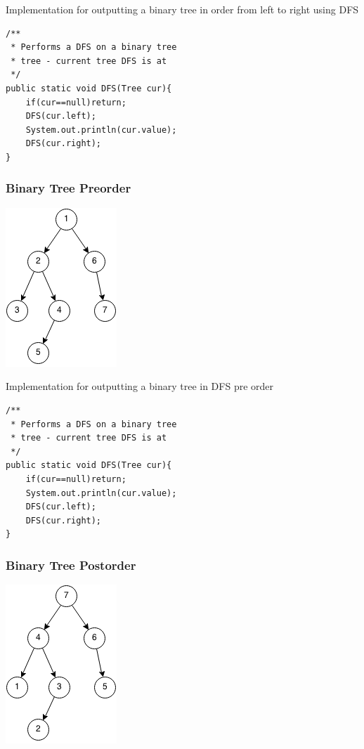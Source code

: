 \documentclass[11pt,oneside]{book}
\makeatletter
\def\maxwidth#1{\ifdim\Gin@nat@width>#1 #1\else\Gin@nat@width\fi}
\makeatother
\begin{document}
Implementation for outputting a binary tree in order from left to right using DFS

\begin{lstlisting}
/**
 * Performs a DFS on a binary tree
 * tree - current tree DFS is at
 */
public static void DFS(Tree cur){
    if(cur==null)return;
    DFS(cur.left);
    System.out.println(cur.value);
    DFS(cur.right);
}
\end{lstlisting}

\subsubsection{Binary Tree Preorder}

\vspace{5px}\includegraphics[width=\maxwidth{\textwidth}]{dfs-preorder.png}

Implementation for outputting a binary tree in DFS pre order

\begin{lstlisting}
/**
 * Performs a DFS on a binary tree
 * tree - current tree DFS is at
 */
public static void DFS(Tree cur){
    if(cur==null)return;
    System.out.println(cur.value);
    DFS(cur.left);
    DFS(cur.right);
}
\end{lstlisting}

\subsubsection{Binary Tree Postorder}

\vspace{5px}\includegraphics[width=\maxwidth{\textwidth}]{dfs-postorder.png}
\end{document}
